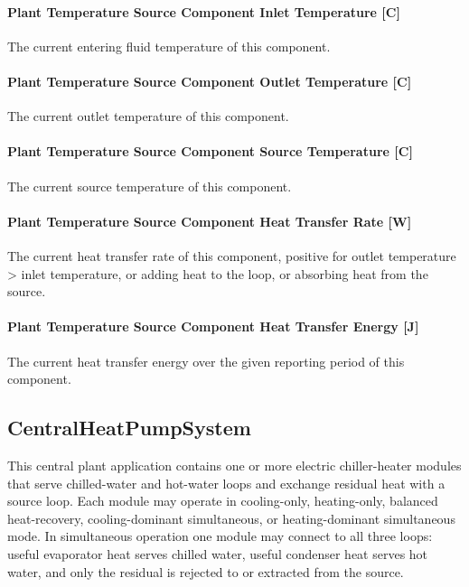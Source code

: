 \paragraph{Plant Temperature Source Component Inlet Temperature {[}C{]}}\label{plant-temperature-source-component-inlet-temperature-c}

The current entering fluid temperature of this component.

\paragraph{Plant Temperature Source Component Outlet Temperature {[}C{]}}\label{plant-temperature-source-component-outlet-temperature-c}

The current outlet temperature of this component.

\paragraph{Plant Temperature Source Component Source Temperature {[}C{]}}\label{plant-temperature-source-component-source-temperature-c}

The current source temperature of this component.

\paragraph{Plant Temperature Source Component Heat Transfer Rate {[}W{]}}\label{plant-temperature-source-component-heat-transfer-rate-w}

The current heat transfer rate of this component, positive for outlet temperature \textgreater{} inlet temperature, or adding heat to the loop, or absorbing heat from the source.

\paragraph{Plant Temperature Source Component Heat Transfer Energy {[}J{]}}\label{plant-temperature-source-component-heat-transfer-energy-j}

The current heat transfer energy over the given reporting period of this component.

\subsection{CentralHeatPumpSystem}\label{centralheatpumpsystem}

This central plant application contains one or more electric chiller-heater modules that serve chilled-water and hot-water loops and exchange residual heat with a source loop. Each module may operate in cooling-only, heating-only, balanced heat-recovery, cooling-dominant simultaneous, or heating-dominant simultaneous mode. In simultaneous operation one module may connect to all three loops: useful evaporator heat serves chilled water, useful condenser heat serves hot water, and only the residual is rejected to or extracted from the source.


